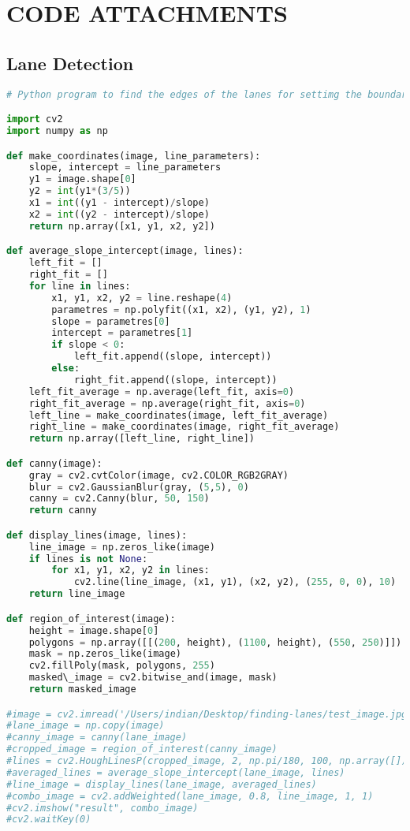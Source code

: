 \chapter{CODE ATTACHMENTS}

\section{Lane Detection}

\begin{lstlisting}[language=Python]
# Python program to find the edges of the lanes for settimg the boundary limit

import cv2
import numpy as np

def make_coordinates(image, line_parameters):
	slope, intercept = line_parameters
	y1 = image.shape[0]
	y2 = int(y1*(3/5))
	x1 = int((y1 - intercept)/slope)
	x2 = int((y2 - intercept)/slope)
	return np.array([x1, y1, x2, y2])

def average_slope_intercept(image, lines):
	left_fit = []
	right_fit = []
	for line in lines:
		x1, y1, x2, y2 = line.reshape(4)
		parametres = np.polyfit((x1, x2), (y1, y2), 1)
		slope = parametres[0]
		intercept = parametres[1]
		if slope < 0:
			left_fit.append((slope, intercept))
		else:
			right_fit.append((slope, intercept))
	left_fit_average = np.average(left_fit, axis=0)
	right_fit_average = np.average(right_fit, axis=0)
	left_line = make_coordinates(image, left_fit_average)
	right_line = make_coordinates(image, right_fit_average)
	return np.array([left_line, right_line])

def canny(image):
	gray = cv2.cvtColor(image, cv2.COLOR_RGB2GRAY)
	blur = cv2.GaussianBlur(gray, (5,5), 0)
	canny = cv2.Canny(blur, 50, 150)
	return canny

def display_lines(image, lines):
	line_image = np.zeros_like(image)
	if lines is not None:
		for x1, y1, x2, y2 in lines:
			cv2.line(line_image, (x1, y1), (x2, y2), (255, 0, 0), 10)
	return line_image

def region_of_interest(image):
	height = image.shape[0]
	polygons = np.array([[(200, height), (1100, height), (550, 250)]])
	mask = np.zeros_like(image)
	cv2.fillPoly(mask, polygons, 255)
	masked\_image = cv2.bitwise_and(image, mask)
	return masked_image

#image = cv2.imread('/Users/indian/Desktop/finding-lanes/test_image.jpg')
#lane_image = np.copy(image)
#canny_image = canny(lane_image)
#cropped_image = region_of_interest(canny_image)
#lines = cv2.HoughLinesP(cropped_image, 2, np.pi/180, 100, np.array([]), minLineLength=40, maxLineGap=5)
#averaged_lines = average_slope_intercept(lane_image, lines)
#line_image = display_lines(lane_image, averaged_lines)
#combo_image = cv2.addWeighted(lane_image, 0.8, line_image, 1, 1)
#cv2.imshow("result", combo_image)
#cv2.waitKey(0)


\end{lstlisting}
